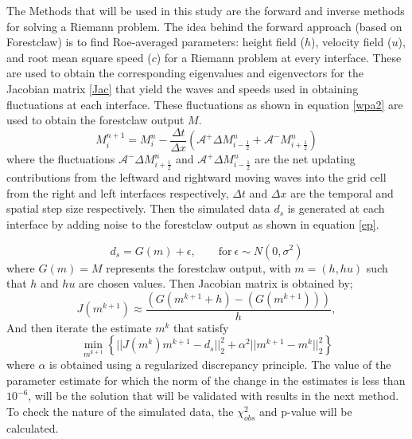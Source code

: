 \documentclass[11pt,a4paper]{article}
\begin{document}
	The Methods that will be used in this study are the forward and inverse methods for solving a Riemann problem. The idea behind the forward approach (based on Forestclaw) is to find Roe-averaged parameters: height field ($h$), velocity  field ($u$), and root mean square speed ($c$) for a Riemann problem at every interface.  These are used to obtain the corresponding eigenvalues and eigenvectors for the Jacobian matrix \eqref{Jac} that yield the waves and speeds used in obtaining fluctuations at each interface. These fluctuations as shown in equation \eqref{wpa2} are used to obtain the  forestclaw output $M$.
	\begin{equation}
		M_{i}^{n+1} =  M_{i}^{n} - \frac{\Delta t}{\Delta x}(\mathcal{A^{+}}\Delta 	M_{i-\frac{1}{2}}^{n} + \mathcal{A^{-}}M_{i+\frac{1}{2}}^{n})
		\label{wpa2}
	\end{equation}
	where  the fluctuations  $\mathcal{A^{-}}\Delta 	M_{i+\frac{1}{2}}^{n}$ and  $\mathcal{A^{+}}\Delta M_{i-\frac{1}{2}}^{n}$ are the net updating contributions from the  leftward and rightward moving waves into the grid cell  from the right and left interfaces respectively, $\Delta t$ and $\Delta x $ are the temporal and spatial step size respectively.
	Then the simulated data $d_s$ is generated at each interface by adding noise to the forestclaw output as shown in equation \eqref{ep}.
	
	\begin{equation}
		d_s =G(m) + \epsilon,  \qquad \text{for} ~ \epsilon \sim N(0,\sigma^{2})
		\label{ep}
	\end{equation}
	where $G(m) = M$ represents the forestclaw output, with $m=(h,hu)$ such that $h$ and $hu$ are chosen values. Then Jacobian matrix is obtained by;
	\begin{equation}
		J(m^{k+1})  \approx \frac{(G(m^{k+1} + h) - (G(m^{k+1})))}{h},
	\end{equation}
	And then iterate the estimate $m^{k}$ that satisfy
	\begin{equation}
		\min_{m^{k+1}} \left\lbrace ||J(m^{k})m^{k+1} - d_s||_2^{2} + \alpha^{2}||m^{k+1} - m^{k}||_2^{2} \right\rbrace 
	\end{equation}
	where $\alpha$ is obtained using a regularized discrepancy principle. The value of the parameter estimate for which the norm of the change in the estimates is less than $10^{-6}$, will be the solution that will be validated with results in the next method. To check the nature of the simulated data, the $\chi_{obs}^{2}$ and p-value will be calculated.\\ 
	
\end{document}
